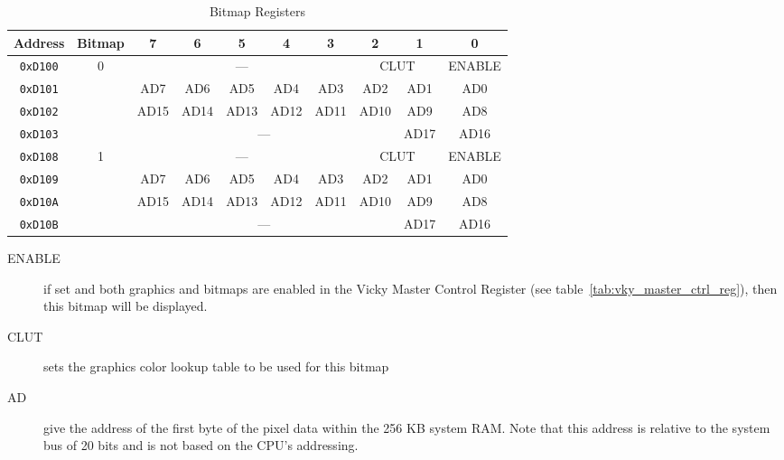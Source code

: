 \begin{table}[h]
    \begin{center}
        \begin{tabular}{|c|c|c|c|c|c|c|c|c|c|} \hline
            Address & Bitmap & 7 & 6 & 5 & 4 & 3 & 2 & 1 & 0 \\ \hline\hline
            \verb+0xD100+ & \multirow{4}{*}{0} & \multicolumn{5}{|c|}{---} & \multicolumn{2}{|c|}{CLUT} & ENABLE \\\cline{1-1}\cline{3-10}
            \verb+0xD101+ & & AD7 & AD6 & AD5 & AD4 & AD3 & AD2 & AD1 & AD0 \\\cline{1-1}\cline{3-10}
            \verb+0xD102+ & & AD15 & AD14 & AD13 & AD12 & AD11 & AD10 & AD9 & AD8 \\\cline{1-1}\cline{3-10}
            \verb+0xD103+ & & \multicolumn{6}{|c|}{---} & AD17 & AD16 \\ \hline
            \verb+0xD108+ & \multirow{4}{*}{1} & \multicolumn{5}{|c|}{---} & \multicolumn{2}{|c|}{CLUT} & ENABLE \\\cline{1-1}\cline{3-10}
            \verb+0xD109+ & & AD7 & AD6 & AD5 & AD4 & AD3 & AD2 & AD1 & AD0 \\\cline{1-1}\cline{3-10}
            \verb+0xD10A+ & & AD15 & AD14 & AD13 & AD12 & AD11 & AD10 & AD9 & AD8 \\\cline{1-1}\cline{3-10}
            \verb+0xD10B+ & & \multicolumn{6}{|c|}{---} & AD17 & AD16 \\ \hline
        \end{tabular}
    \end{center}
    \caption{Bitmap Registers}
    \label{tab:bm_registers}
\end{table}

\begin{description}
    \item[ENABLE] if set and both graphics and bitmaps are enabled in the Vicky Master Control Register (see table~\ref{tab:vky_master_ctrl_reg}), then this bitmap will be displayed.

    \item[CLUT] sets the graphics color lookup table to be used for this bitmap

    \item[AD] give the address of the first byte of the pixel data within the 256 KB system RAM. Note that this address is relative to the system bus of 20 bits and is not based on the CPU's addressing.
\end{description}
